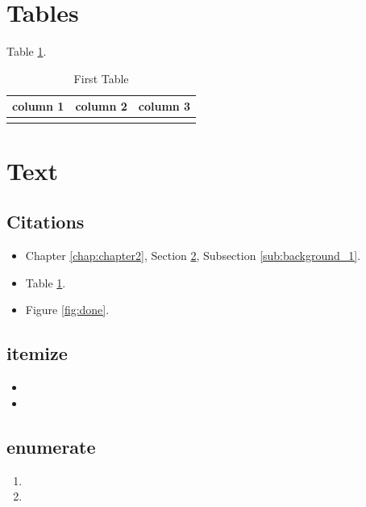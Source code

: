 \documentclass[letterpaper, 12pt, oneside]{book}
\theoremstyle{plain}
\theoremstyle{definition}
\theoremstyle{remark}
\begin{document}
\lipsum[1]

\section{Tables} %
\label{sec:tables}
Table \ref{tab:tablename}.

\begin{table}[tb]
  \caption{First Table}
  \label{tab:tablename}
  \centering

  \begin{tabular}{l|cc}
  \hline

  \hline
  \textbf{column 1} & \textbf{column 2} & \textbf{column 3} \\
  \hline
     & & \\
  \hline

  \hline
  \end{tabular}
\end{table}

\lipsum[1]

\section{Text} %
\label{sec:text}

\subsection{Citations} %
\label{sub:citations}
\begin{itemize}
\item Chapter \ref{chap:chapter2}, Section \ref{sec:text}, Subsection \ref{sub:background_1}.
\item Table \ref{tab:tablename}.
\item Figure \ref{fig:done}.
\end{itemize}

\subsection{itemize} %
\label{sub:itemize}

\begin{itemize}
\item \lipsum[1]
\item \lipsum[1]
\end{itemize}

\subsection{enumerate} %
\label{sub:enumerate}

\begin{enumerate}
\item \lipsum[1]
\item \lipsum[1]
\end{enumerate}





\renewcommand\bibname{References}


% 
% 
\end{document}
